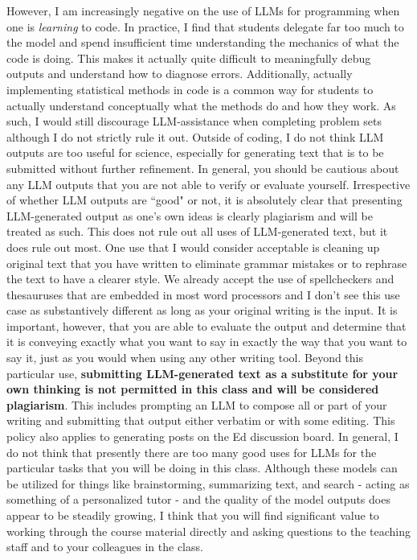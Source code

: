 \documentclass[11pt, article, oneside]{memoir}
\theoremstyle{Assumption}
\begin{document}
\newline\newline
However, I am increasingly negative on the use of LLMs for programming when one is \textit{learning} to code. In practice, I find that students delegate far too much to the model and spend insufficient time understanding the mechanics of what the code is doing. This makes it actually quite difficult to meaningfully debug outputs and understand how to diagnose errors. Additionally, actually implementing statistical methods in code is a common way for students to actually understand conceptually what the methods do and how they work. As such, I would still discourage LLM-assistance when completing problem sets although I do not strictly rule it out.
\newline\newline
Outside of coding, I do not think LLM outputs are too useful for science, especially for generating text that is to be submitted without further refinement. In general, you should be cautious about any LLM outputs that you are not able to verify or evaluate yourself. 
\newline\newline
Irrespective of whether LLM outputs are ``good" or not, it is absolutely clear that presenting LLM-generated output as one's own ideas is clearly plagiarism and will be treated as such. This does not rule out all uses of LLM-generated text, but it does rule out most. One use that I would consider acceptable is cleaning up original text that you have written to eliminate grammar mistakes or to rephrase the text to have a clearer style. We already accept the use of spellcheckers and thesauruses that are embedded in most word processors and I don't see this use case as substantively different as long as your original writing is the input. It is important, however, that you are able to evaluate the output and determine that it is conveying exactly what you want to say in exactly the way that you want to say it, just as you would when using any other writing tool.
\newline\newline
Beyond this particular use, \textbf{submitting LLM-generated text as a substitute for your own thinking is not permitted in this class and will be considered plagiarism}. This includes prompting an LLM to compose all or part of your writing and submitting that output either verbatim or with some editing. This policy also applies to generating posts on the Ed discussion board. 
\newline\newline
In general, I do not think that presently there are too many good uses for LLMs for the particular tasks that you will be doing in this class. Although these models can be utilized for things like brainstorming, summarizing text, and search - acting as something of a personalized tutor - and the quality of the model outputs does appear to be steadily growing, I think that you will find significant value to working through the course material directly and asking questions to the teaching staff and to your colleagues in the class.
\end{document}

